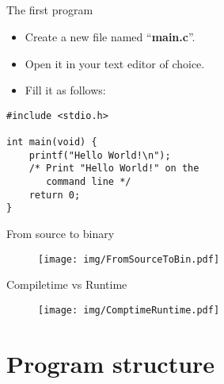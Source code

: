 \documentclass[10pt,graphics,aspectratio=169,table]{beamer}
\begin{document}
\subsection{}
\begin{frame}[fragile]{The first program}
	\begin{itemize}
		\item Create a new file named ``\textbf{main.c}''.
		\item Open it in your text editor of choice.
		\item Fill it as follows:
	\end{itemize}
	\begin{lstlisting}
#include <stdio.h>

int main(void) {
	printf("Hello World!\n");
	/* Print "Hello World!" on the
	   command line */
	return 0;
}
\end{lstlisting}
\end{frame}
\begin{frame}[fragile]{From source to binary}
    \begin{figure}
        \centering
        \texttt{[image: img/FromSourceToBin.pdf]}
    \end{figure}
\end{frame}
\begin{frame}[fragile]{Compiletime vs Runtime}
    \begin{figure}
        \centering
        \texttt{[image: img/ComptimeRuntime.pdf]}
    \end{figure}
\end{frame}
\section{Program structure}
\end{document}
